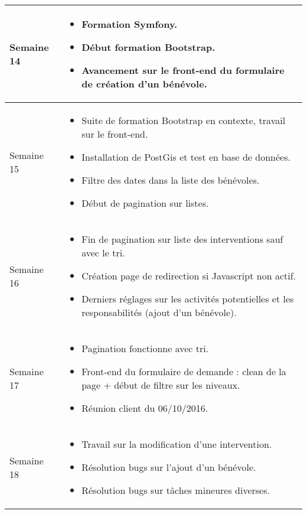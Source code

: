 \documentclass [a4paper] {article}
\begin{document}
\section*{\Francois}

\centering
	\begin{longtable}{|>{\columncolor{gray!40}}p{2cm}|p{12cm}|}
	\hline
	Semaine 14 & \begin{itemize}
	\item Formation Symfony.
	\item Début formation Bootstrap.
	\item Avancement sur le front-end du formulaire de création d'un bénévole.
	\end{itemize}	 \\
	\hline
	
	Semaine 15 & \begin{itemize}
	\item Suite de formation Bootstrap en contexte, travail sur le front-end.
	\item Installation de PostGis et test en base de données.
	\item Filtre des dates dans la liste des bénévoles.
	\item Début de pagination sur listes.
\end{itemize}	 \\
	\hline
	
	Semaine 16 & \begin{itemize}
	\item Fin de pagination sur liste des interventions sauf avec le tri.
	\item Création page de redirection si Javascript non actif.
	\item Derniers réglages sur les activités potentielles et les responsabilités (ajout d'un bénévole).
\end{itemize}	 \\
	\hline
	
	Semaine 17 & \begin{itemize}
	\item Pagination fonctionne avec tri.
	\item Front-end du formulaire de demande : clean de la page + début de filtre sur les niveaux.
	\item Réunion client du 06/10/2016.
\end{itemize}	 \\
	\hline
	
	Semaine 18 & \begin{itemize}
	\item Travail sur la modification d'une intervention.
	\item Résolution bugs sur l'ajout d'un bénévole.
	\item Résolution bugs sur tâches mineures diverses.
\end{itemize}	 \\
	\hline
	

\end{longtable}
\end{document}
